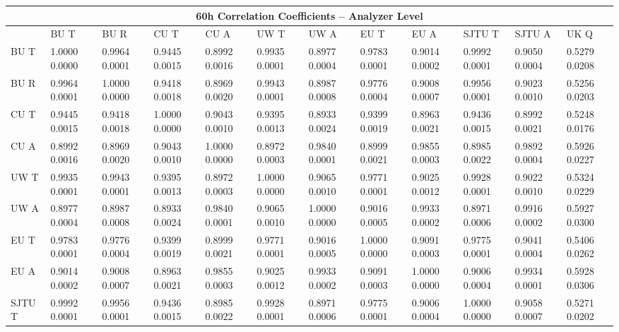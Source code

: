 \begin{landscape}
\begin{table}
\small
\centering
\renewcommand{\arraystretch}{1.5}
\begin{tabularx}{1\linewidth}{@{\extracolsep{\fill}}lXXXXXXXXXXX}
  \toprule
  	\multicolumn{12}{c}{{\normalsize 60h Correlation Coefficients -- Analyzer Level}} \\
  \midrule
  	       & BU T & BU R & CU T & CU A & UW T & UW A & EU T & EU A & SJTU T & SJTU A & UK Q \\
  \midrule
	BU T   & 1.0000 0.0000 & 0.9964 0.0001 & 0.9445 0.0015 & 0.8992 0.0016 & 0.9935 0.0001 & 0.8977 0.0004 & 0.9783 0.0001 & 0.9014 0.0002 & 0.9992 0.0001 & 0.9050 0.0004 & 0.5279 0.0208  \\
	BU R   & 0.9964 0.0001 & 1.0000 0.0000 & 0.9418 0.0018 & 0.8969 0.0020 & 0.9943 0.0001 & 0.8987 0.0008 & 0.9776 0.0004 & 0.9008 0.0007 & 0.9956 0.0001 & 0.9023 0.0010 & 0.5256 0.0203  \\
	CU T   & 0.9445 0.0015 & 0.9418 0.0018 & 1.0000 0.0000 & 0.9043 0.0010 & 0.9395 0.0013 & 0.8933 0.0024 & 0.9399 0.0019 & 0.8963 0.0021 & 0.9436 0.0015 & 0.8992 0.0021 & 0.5248 0.0176  \\
	CU A   & 0.8992 0.0016 & 0.8969 0.0020 & 0.9043 0.0010 & 1.0000 0.0000 & 0.8972 0.0003 & 0.9840 0.0001 & 0.8999 0.0021 & 0.9855 0.0003 & 0.8985 0.0022 & 0.9892 0.0004 & 0.5926 0.0227  \\
	UW T   & 0.9935 0.0001 & 0.9943 0.0001 & 0.9395 0.0013 & 0.8972 0.0003 & 1.0000 0.0000 & 0.9065 0.0010 & 0.9771 0.0001 & 0.9025 0.0012 & 0.9928 0.0001 & 0.9022 0.0010 & 0.5324 0.0229  \\
	UW A   & 0.8977 0.0004 & 0.8987 0.0008 & 0.8933 0.0024 & 0.9840 0.0001 & 0.9065 0.0010 & 1.0000 0.0000 & 0.9016 0.0005 & 0.9933 0.0002 & 0.8971 0.0006 & 0.9916 0.0002 & 0.5927 0.0300  \\
	EU T   & 0.9783 0.0001 & 0.9776 0.0004 & 0.9399 0.0019 & 0.8999 0.0021 & 0.9771 0.0001 & 0.9016 0.0005 & 1.0000 0.0000 & 0.9091 0.0003 & 0.9775 0.0001 & 0.9041 0.0004 & 0.5406 0.0262  \\
	EU A   & 0.9014 0.0002 & 0.9008 0.0007 & 0.8963 0.0021 & 0.9855 0.0003 & 0.9025 0.0012 & 0.9933 0.0002 & 0.9091 0.0003 & 1.0000 0.0000 & 0.9006 0.0004 & 0.9934 0.0001 & 0.5928 0.0306  \\
	SJTU T & 0.9992 0.0001 & 0.9956 0.0001 & 0.9436 0.0015 & 0.8985 0.0022 & 0.9928 0.0001 & 0.8971 0.0006 & 0.9775 0.0001 & 0.9006 0.0004 & 1.0000 0.0000 & 0.9058 0.0007 & 0.5271 0.0202  \\

\end{tabularx}
\end{table}
\end{landscape}
